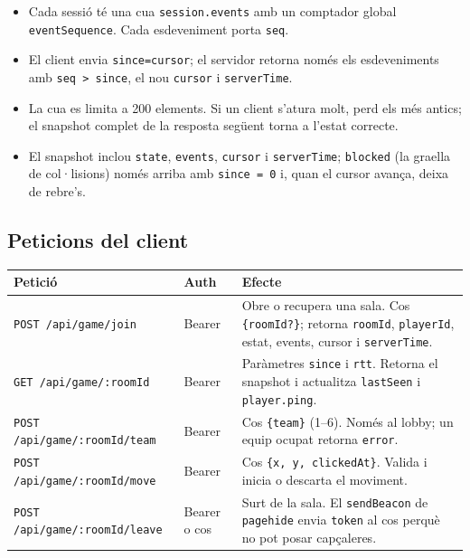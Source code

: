 \documentclass[10pt,a4paper]{article}
\begin{document}
\begin{itemize}[nosep]
  \item Cada sessió té una cua \texttt{session.events} amb un comptador global
        \texttt{eventSequence}. Cada esdeveniment porta \texttt{seq}.
  \item El client envia \texttt{since=cursor}; el servidor retorna només els
        esdeveniments amb \texttt{seq > since}, el nou \texttt{cursor} i
        \texttt{serverTime}.
  \item La cua es limita a 200 elements. Si un client s'atura molt, perd els més
        antics; el snapshot complet de la resposta següent torna a l'estat correcte.
  \item El snapshot inclou \texttt{state}, \texttt{events}, \texttt{cursor} i
        \texttt{serverTime}; \texttt{blocked} (la graella de col·lisions) només arriba
        amb \texttt{since = 0} i, quan el cursor avança, deixa de rebre's.
\end{itemize}

\subsection*{Peticions del client}

\begin{table}[ht]
\small
\begin{tabularx}{\textwidth}{@{}p{6.2cm}p{1.1cm}X@{}}
\toprule
\textbf{Petició} & \textbf{Auth} & \textbf{Efecte} \\
\midrule
\texttt{POST /api/game/join} & Bearer & Obre o recupera una sala. Cos
\texttt{\{roomId?\}}; retorna \texttt{roomId}, \texttt{playerId}, estat, events,
cursor i \texttt{serverTime}. \\
\texttt{GET /api/game/:roomId} & Bearer & Paràmetres \texttt{since} i \texttt{rtt}.
Retorna el snapshot i actualitza \texttt{lastSeen} i \texttt{player.ping}. \\
\texttt{POST /api/game/:roomId/team} & Bearer & Cos \texttt{\{team\}} (1--6). Només al
lobby; un equip ocupat retorna \texttt{error}. \\
\texttt{POST /api/game/:roomId/move} & Bearer & Cos \texttt{\{x, y, clickedAt\}}.
Valida i inicia o descarta el moviment. \\
\texttt{POST /api/game/:roomId/leave} & Bearer o cos & Surt de la sala. El
\texttt{sendBeacon} de \texttt{pagehide} envia \texttt{token} al cos perquè no pot
posar capçaleres. \\
\bottomrule
\end{tabularx}
\end{table}
\end{document}
